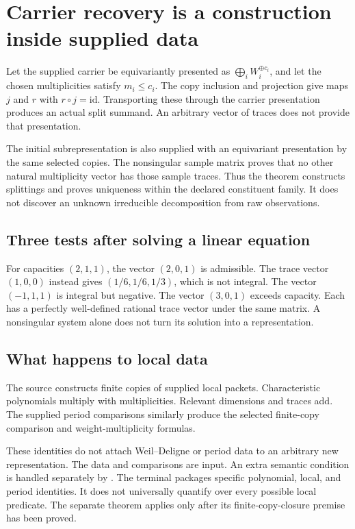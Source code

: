 \clearpage
\section{Carrier recovery is a construction inside supplied data}
\label{sec:carrier}
Let the supplied carrier be equivariantly presented as
$\bigoplus_i W_i^{\oplus c_i}$, and let the chosen multiplicities satisfy
$m_i\le c_i$. The copy inclusion and projection give maps $j$ and $r$ with
$r\circ j=\mathrm{id}$. Transporting these through the carrier presentation
produces an actual split summand. An arbitrary vector of traces does not provide
that presentation.

The initial subrepresentation is also supplied with an equivariant presentation
by the same selected copies. The nonsingular sample matrix proves that no other
natural multiplicity vector has those sample traces. Thus the theorem constructs
splittings and proves uniqueness within the declared constituent family. It does
not discover an unknown irreducible decomposition from raw observations.

\subsection{Three tests after solving a linear equation}
For capacities $(2,1,1)$, the vector $(2,0,1)$ is admissible. The trace vector
$(1,0,0)$ instead gives $(1/6,1/6,1/3)$, which is not integral. The vector
$(-1,1,1)$ is integral but negative. The vector $(3,0,1)$ exceeds capacity.
Each has a perfectly well-defined rational trace vector under the same matrix.
A nonsingular system alone does not turn its solution into a representation.

\subsection{What happens to local data}
The source constructs finite copies of supplied local packets. Characteristic
polynomials multiply with multiplicities. Relevant dimensions and traces add.
The supplied period comparisons similarly produce the selected finite-copy
comparison and weight-multiplicity formulas.

These identities do not attach Weil--Deligne or period data to an arbitrary
new representation. The data and comparisons are input. An extra semantic
condition is handled separately by . The terminal
 packages specific polynomial, local, and period
identities. It does not universally quantify over every possible local predicate.
The separate  theorem applies only after its
finite-copy-closure premise has been proved.


